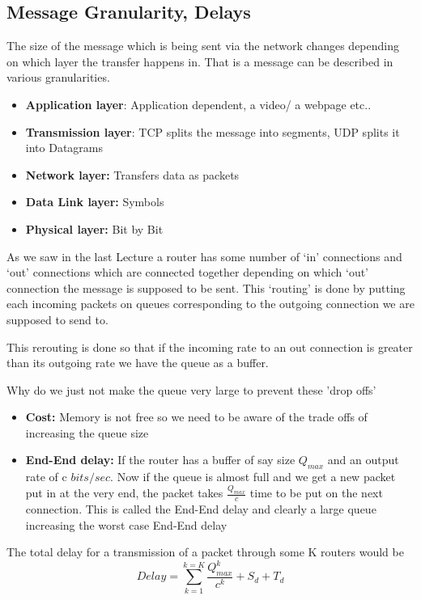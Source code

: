 \documentclass[12pt]{article}
\begin{document}
\subsection{Message Granularity, Delays}

The size of the message which is being sent via the network changes depending on which layer the transfer happens in.
That is a message can be described in various granularities.
\begin{itemize}
    \item \textbf{Application layer}: Application dependent, a video/ a webpage etc..
    \item \textbf{Transmission layer}: TCP splits the message into segments, UDP splits it into Datagrams
    \item \textbf{Network layer:} Transfers data as packets
    \item \textbf{Data Link layer:} Symbols
    \item \textbf{Physical layer:} Bit by Bit
\end{itemize}


As we saw in the last Lecture a router has some number of `in' connections and `out' connections which are connected together depending on which 
`out' connection the message is supposed to be sent. This  `routing' is done by putting each incoming packets on queues corresponding to the outgoing connection we 
are supposed to send to.

This rerouting is done so that if the incoming rate to an out connection is greater than its outgoing rate we have the queue as a buffer.


Why do we just not make the queue very large to prevent these 'drop offs'
\begin{itemize}
    \item \textbf{Cost:} Memory is not free so we need to be aware of the trade offs of increasing the queue size
    \item \textbf{End-End delay:} If the router has a buffer of say size $Q_{max}$ and an output rate of c $bits/sec$.
    Now if the queue is almost full and we get a new packet put in at the very end, the packet takes $\frac{Q_{max}}{c}$ time to be put on the next connection. 
    This is called the End-End delay and clearly a large queue increasing the worst case End-End delay
\end{itemize}

The total delay for a transmission of a packet through some K routers would be 
\[ Delay = \sum_{k = 1}^{k = K}\frac{Q_{max}^k}{c^k} + S_d + T_d\]
\end{document}
